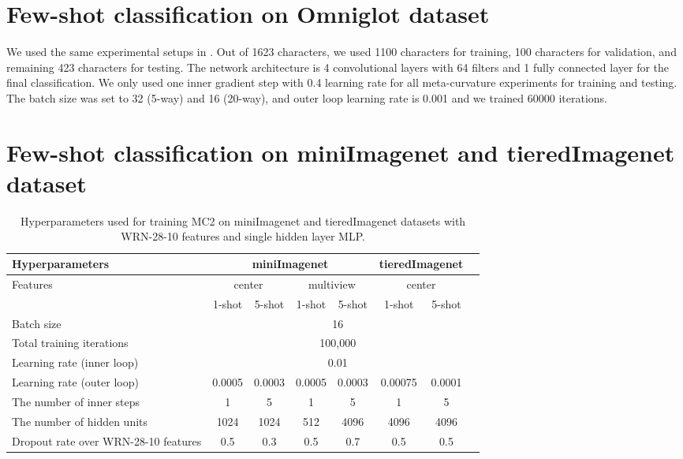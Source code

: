 \documentclass{article}
\begin{document}
\section{Few-shot classification on Omniglot dataset}
We used the same experimental setups in \cite{Finn-icml-2017}. Out of 1623 characters, we used 1100 characters for training, 100 characters for validation, and remaining 423 characters for testing. The network architecture is 4 convolutional layers with 64 filters and 1 fully connected layer for the final classification. We only used one inner gradient step with 0.4 learning rate for all meta-curvature experiments for training and testing. The batch size was set to 32 (5-way) and 16 (20-way), and outer loop learning rate is 0.001 and we trained 60000 iterations.

\section{Few-shot classification on miniImagenet and tieredImagenet dataset}

\begin{table}[t]
\caption{Hyperparameters used for training MC2 on miniImagenet and tieredImagenet datasets with WRN-28-10 features and single hidden layer MLP.}
\label{table:miniimagenet_wrn_hyper}
\begin{center}
\begin{small}
\begin{tabular}{lccccccc}
\toprule
Hyperparameters & \multicolumn{4}{c}{miniImagenet} & \multicolumn{2}{c}{tieredImagenet} \\
\midrule
Features & \multicolumn{2}{c}{center} & \multicolumn{2}{c}{multiview} & \multicolumn{2}{c}{center} \\
& 1-shot & 5-shot & 1-shot & 5-shot & 1-shot & 5-shot \\
\midrule
Batch size & \multicolumn{6}{c}{16} \\
Total training iterations & \multicolumn{6}{c}{100,000} \\
Learning rate (inner loop) & \multicolumn{6}{c}{0.01} \\
\midrule
Learning rate (outer loop) & 0.0005 & 0.0003 & 0.0005 & 0.0003 & 0.00075 & 0.0001 \\
The number of inner steps  & 1 & 5 & 1 & 5 & 1 & 5 \\
The number of hidden units  & 1024 & 1024 & 512 & 4096 & 4096 & 4096 \\
Dropout rate over WRN-28-10 features & 0.5 & 0.3 & 0.5 & 0.7 & 0.5 & 0.5 \\
\bottomrule
\end{tabular}
\end{small}
\end{center}
\end{table}
\end{document}
